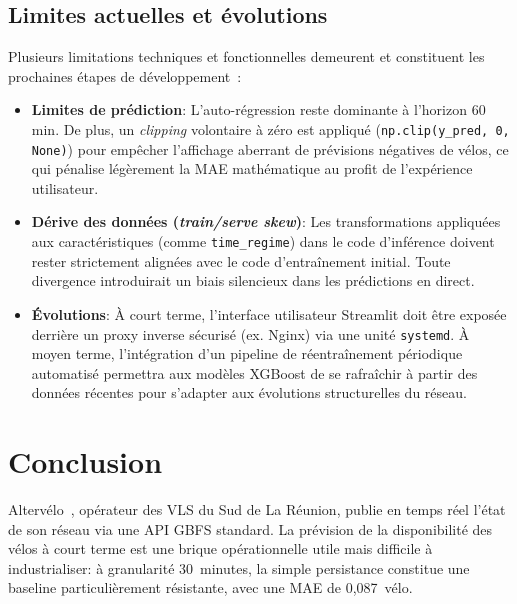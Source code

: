 \documentclass[fleqn, 12pt]{scrartcl}
\newcommand{\ent}{Altervélo}
\begin{document}
\subsection{Limites actuelles et évolutions}
Plusieurs limitations techniques et fonctionnelles demeurent et constituent les prochaines étapes de développement~:
\begin{itemize}
    \item \textbf{Limites de prédiction}: L'auto-régression reste dominante à l'horizon 60 min. De plus, un \emph{clipping} volontaire à zéro est appliqué (\verb|np.clip(y_pred, 0, None)|) pour empêcher l'affichage aberrant de prévisions négatives de vélos, ce qui pénalise légèrement la MAE mathématique au profit de l'expérience utilisateur.
    \item \textbf{Dérive des données (\emph{train/serve skew})}: Les transformations appliquées aux caractéristiques (comme \texttt{time\_regime}) dans le code d'inférence doivent rester strictement alignées avec le code d'entraînement initial. Toute divergence introduirait un biais silencieux dans les prédictions en direct.
    \item \textbf{Évolutions}: À court terme, l'interface utilisateur Streamlit doit être exposée derrière un proxy inverse sécurisé (ex. Nginx) via une unité \texttt{systemd}. À moyen terme, l'intégration d'un pipeline de réentraînement périodique automatisé permettra aux modèles XGBoost de se rafraîchir à partir des données récentes pour s'adapter aux évolutions structurelles du réseau.
\end{itemize}



\newpage

\section{Conclusion}%
\label{sec:conclusion}

\ent~\cite{altervelo}, opérateur des VLS du Sud de La Réunion, publie en temps réel l'état de son réseau via une API GBFS standard. La prévision de la disponibilité des vélos à court terme est une brique opérationnelle utile mais difficile à industrialiser: à granularité 30~minutes, la simple persistance constitue une baseline particulièrement résistante, avec une MAE de 0{,}087~vélo.
\end{document}
